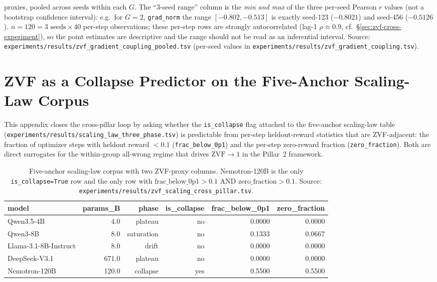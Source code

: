 \documentclass{article}
\begin{document}
\begin{table}[htbp]
{proxies, pooled across seeds within each $G$. The ``3-seed range''
column is the \emph{min and max} of the three per-seed Pearson $r$
values (not a bootstrap confidence interval): e.g.\ for $G{=}2$,
\texttt{grad\_norm} the range $[-0.802, -0.513]$ is exactly seed-123
($-0.8021$) and seed-456 ($-0.5126$). $n = 120 = 3\text{ seeds}
\times 40$ per-step observations; these per-step rows are strongly
autocorrelated (lag-1 $\rho \approx 0.9$, cf.\
\S\ref{sec:zvf-cross-experiment}), so the point estimates are
descriptive and the range should not be read as an inferential
interval. Source:
\texttt{experiments/results/zvf\_gradient\_coupling\_pooled.tsv}
(per-seed values in
\texttt{experiments/results/zvf\_gradient\_coupling.tsv}).}
\label{tab:zvf-gradient-coupling}
\end{table}
 


\section{ZVF as a Collapse Predictor on the Five-Anchor Scaling-Law Corpus}
\label{sec:zvf-scaling}

This appendix closes the cross-pillar loop by asking whether the
\texttt{is\_collapse} flag attached to the five-anchor scaling-law
table (\texttt{experiments/results/scaling\_law\_three\_phase.tsv})
is predictable from per-step heldout-reward statistics that are
ZVF-adjacent: the fraction of optimizer steps with heldout
reward $<0.1$ (\texttt{frac\_below\_0p1}) and the per-step
zero-reward fraction (\texttt{zero\_fraction}). Both are direct
surrogates for the within-group all-wrong regime that drives
$\mathrm{ZVF} \to 1$ in the Pillar~2 framework.

\begin{table}[htbp]
\centering
\small
\begin{tabular}{lrrrrr}
\toprule
model & params\_B & phase & is\_collapse & frac\_below\_0p1 & zero\_fraction \\
\midrule
Qwen3.5-4B & 4.0 & plateau & no & 0.0000 & 0.0000 \\
Qwen3-8B & 8.0 & saturation & no & 0.1333 & 0.0667 \\
Llama-3.1-8B-Instruct & 8.0 & drift & no & 0.0000 & 0.0000 \\
DeepSeek-V3.1 & 671.0 & plateau & no & 0.0000 & 0.0000 \\
Nemotron-120B & 120.0 & collapse & yes & 0.5500 & 0.5500 \\
\bottomrule
\end{tabular}
\caption{Five-anchor scaling-law corpus with two ZVF-proxy columns. Nemotron-120B is the only \texttt{is\_collapse=True} row and the only row with $\text{frac\_below\_0p1} > 0.1$ AND $\text{zero\_fraction} > 0.1$. Source: \texttt{experiments/results/zvf\_scaling\_cross\_pillar.tsv}.}
\label{tab:zvf-scaling-anchors}
\end{table}
\end{document}
